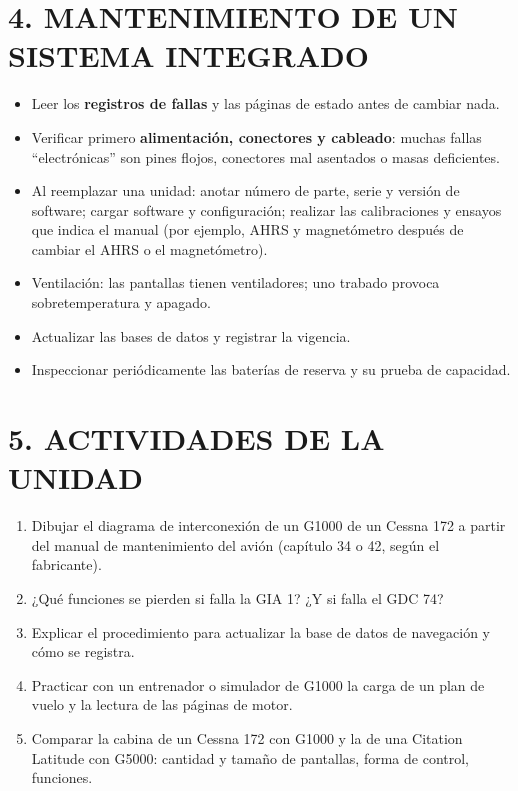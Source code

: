\section*{4. MANTENIMIENTO DE UN SISTEMA INTEGRADO}
\begin{itemize}
  \item Leer los \textbf{registros de fallas} y las páginas de estado antes de cambiar nada.
  \item Verificar primero \textbf{alimentación, conectores y cableado}: muchas fallas
        ``electrónicas'' son pines flojos, conectores mal asentados o masas deficientes.
  \item Al reemplazar una unidad: anotar número de parte, serie y versión de software; cargar
        software y configuración; realizar las calibraciones y ensayos que indica el manual (por
        ejemplo, AHRS y magnetómetro después de cambiar el AHRS o el magnetómetro).
  \item Ventilación: las pantallas tienen ventiladores; uno trabado provoca sobretemperatura y
        apagado.
  \item Actualizar las bases de datos y registrar la vigencia.
  \item Inspeccionar periódicamente las baterías de reserva y su prueba de capacidad.
\end{itemize}

\section*{5. ACTIVIDADES DE LA UNIDAD}
\begin{enumerate}
  \item Dibujar el diagrama de interconexión de un G1000 de un Cessna 172 a partir del manual de
        mantenimiento del avión (capítulo 34 o 42, según el fabricante).
  \item ¿Qué funciones se pierden si falla la GIA 1? ¿Y si falla el GDC 74?
  \item Explicar el procedimiento para actualizar la base de datos de navegación y cómo se registra.
  \item Practicar con un entrenador o simulador de G1000 la carga de un plan de vuelo y la lectura
        de las páginas de motor.
  \item Comparar la cabina de un Cessna 172 con G1000 y la de una Citation Latitude con G5000:
        cantidad y tamaño de pantallas, forma de control, funciones.
\end{enumerate}
